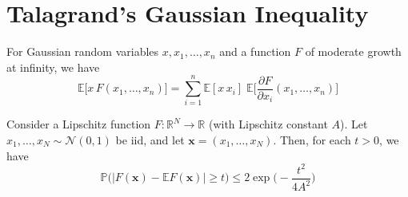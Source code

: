 \section{Talagrand's Gaussian Inequality}

  \begin{lemma}
  For Gaussian random variables $x, x_1, \ldots, x_n$ and a function $F$ of moderate growth at infinity, we have 
  \[\mathbb{E}\big[ x \, F(x_1, \ldots, x_n) \big] = \sum_{i=1}^n \mathbb{E}[x \, x_i] \; \mathbb{E}\bigg[ \frac{\partial F}{\partial x_i} (x_1, \ldots, x_n) \bigg]\]
  \end{lemma}

  \begin{theorem}
  Consider a Lipschitz function $F: \mathbb{R}^N \longrightarrow \mathbb{R}$ (with Lipschitz constant $A$). Let $x_1, \ldots, x_N \sim \mathcal{N}(0, 1)$ be iid, and let $\mathbf{x} = (x_1, \ldots, x_N)$. Then, for each $t > 0$, we have 
  \[\mathbb{P} \big( | F(\mathbf{x}) - \mathbb{E} F(\mathbf{x}) | \geq t \big) \leq 2 \exp \bigg(- \frac{t^2}{4A^2} \bigg)\]
  \end{theorem}
